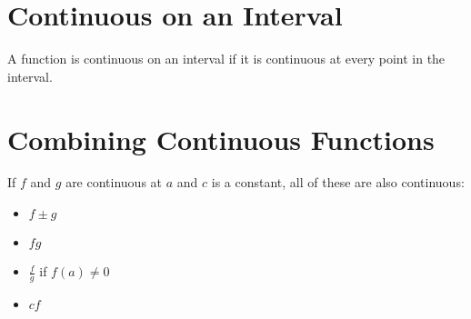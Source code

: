 \documentclass[letterpaper, landscape]{exam}
\begin{document}
  \section{Continuous on an Interval}
  A function is continuous on an interval if it is continuous at every point in the
  interval.

  \section{Combining Continuous Functions}
  If $f$ and $g$ are continuous at $a$ and $c$ is a constant, all of these are also
  continuous:

  \begin{itemize}
    \item $f \pm g$
    \item $fg$
    \item $\frac{f}{g}$ if $f(a) \neq 0$
    \item $cf$
  \end{itemize}
\end{document}
